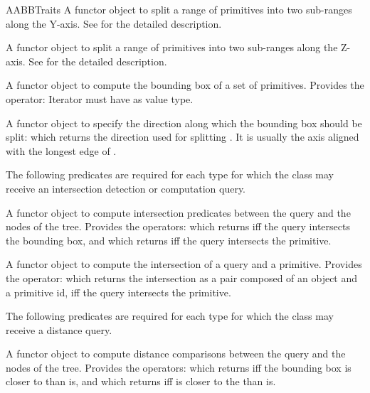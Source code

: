 \begin{ccRefConcept}{AABBTraits}
{A functor object to split a range of primitives into two sub-ranges along the Y-axis. See  for the detailed description.}

{A functor object to split a range of primitives into two sub-ranges along the Z-axis. See  for the detailed description.}

{A functor object to compute the bounding box of a set of primitives. Provides the operator:
 Iterator  must have  as value type. }

{A functor object to specify the direction along which the bounding box should be split:
 which returns the direction used for splitting . It is usually the axis aligned with the longest edge of .}

The following predicates are required for each type 
for which the class  may receive an intersection detection or computation query.

{A functor object to compute intersection predicates between the query and the nodes of the tree. Provides the operators:
 which returns  iff the query intersects the bounding box, and  which returns  iff the query intersects the primitive.}

{A functor object to compute the intersection of a query and a primitive. Provides the operator:
 which returns the intersection as a pair composed of an object and a primitive id, iff the query intersects the primitive.}

The following predicates are required for each type 
for which the class  may receive a distance query.

{A functor object to compute distance comparisons between the query and the nodes of the tree. Provides the operators:
 which returns  iff the bounding box is closer to  than  is, and  which returns  iff  is closer to the  than  is.}


\end{ccRefConcept}
